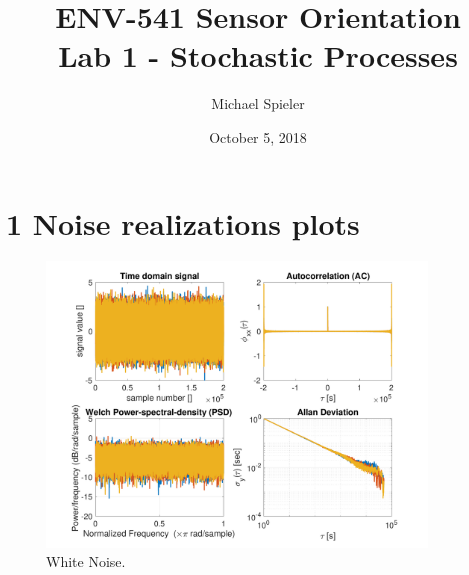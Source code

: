 \documentclass{article}
\title{ENV-541 Sensor Orientation\\Lab 1 - Stochastic Processes}
\author{Michael Spieler}
\date{October 5, 2018}
\begin{document}
\maketitle

\section*{1 Noise realizations plots}


\begin{figure}[H]
    \centering
    \includegraphics[width=0.9\textwidth]{white_noise}
    \caption{White Noise.}
    \label{fig:white_noise}
\end{figure}
\end{document}
